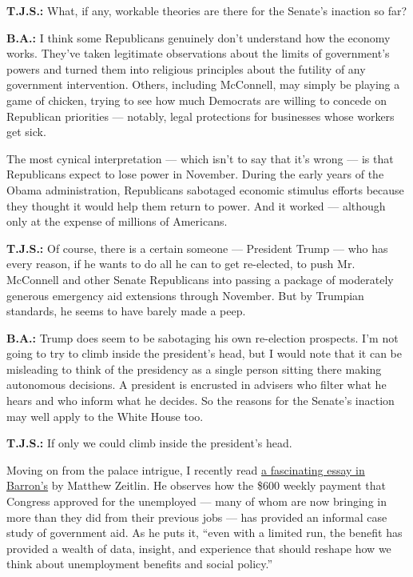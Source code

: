 \textbf{T.J.S.:} What, if any, workable theories are there for the
Senate's inaction so far?

\textbf{B.A.:} I think some Republicans genuinely don't understand how
the economy works. They've taken legitimate observations about the
limits of government's powers and turned them into religious principles
about the futility of any government intervention. Others, including
McConnell, may simply be playing a game of chicken, trying to see how
much Democrats are willing to concede on Republican priorities ---
notably, legal protections for businesses whose workers get sick.

The most cynical interpretation --- which isn't to say that it's wrong
--- is that Republicans expect to lose power in November. During the
early years of the Obama administration, Republicans sabotaged economic
stimulus efforts because they thought it would help them return to
power. And it worked --- although only at the expense of millions of
Americans.

\textbf{T.J.S.:} Of course, there is a certain someone --- President
Trump --- who has every reason, if he wants to do all he can to get
re-elected, to push Mr. McConnell and other Senate Republicans into
passing a package of moderately generous emergency aid extensions
through November. But by Trumpian standards, he seems to have barely
made a peep.

\textbf{B.A.:} Trump does seem to be sabotaging his own re-election
prospects. I'm not going to try to climb inside the president's head,
but I would note that it can be misleading to think of the presidency as
a single person sitting there making autonomous decisions. A president
is encrusted in advisers who filter what he hears and who inform what he
decides. So the reasons for the Senate's inaction may well apply to the
White House too.

\textbf{T.J.S.:} If only we could climb inside the president's head.

Moving on from the palace intrigue, I recently read
\href{https://www.barrons.com/articles/the-best-part-of-the-cares-act-is-dying-it-should-live-again-51596067632}{a
fascinating essay in Barron's} by Matthew Zeitlin. He observes how the
\$600 weekly payment that Congress approved for the unemployed --- many
of whom are now bringing in more than they did from their previous jobs
--- has provided an informal case study of government aid. As he puts
it, ``even with a limited run, the benefit has provided a wealth of
data, insight, and experience that should reshape how we think about
unemployment benefits and social policy.''

